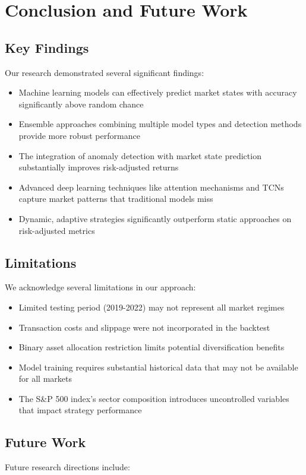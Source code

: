 \documentclass[13pt]{article}
\begin{document}
\section{Conclusion and Future Work}

\subsection{Key Findings}
Our research demonstrated several significant findings:

\begin{itemize}
	\item Machine learning models can effectively predict market states with accuracy significantly above random chance
	\item Ensemble approaches combining multiple model types and detection methods provide more robust performance
	\item The integration of anomaly detection with market state prediction substantially improves risk-adjusted returns
	\item Advanced deep learning techniques like attention mechanisms and TCNs capture market patterns that traditional models miss
	\item Dynamic, adaptive strategies significantly outperform static approaches on risk-adjusted metrics
\end{itemize}

\subsection{Limitations}
We acknowledge several limitations in our approach:

\begin{itemize}
	\item Limited testing period (2019-2022) may not represent all market regimes
	\item Transaction costs and slippage were not incorporated in the backtest
	\item Binary asset allocation restriction limits potential diversification benefits
	\item Model training requires substantial historical data that may not be available for all markets
	\item The S\&P 500 index's sector composition introduces uncontrolled variables that impact strategy performance
\end{itemize}

\subsection{Future Work}
Future research directions include:
\end{document}
